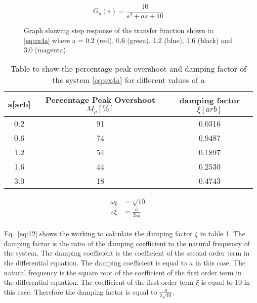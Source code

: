 \renewcommand{\ex}{ex4a}

\begin{equation}
	G_{p}\left(s\right)=\frac{10}{s^2 + as + 10}
	\label{eq:\ex}
\end{equation}


\begin{figure}[ht!]
	\centering
	
	\caption{Graph showing step response of the transfer function shown in \eqref{eq:\ex} where a = 0.2 (red), 0.6 (green), 1.2 (blue), 1.6 (black) and 3.0 (magenta). \appendixamble{\ex}}
	\label{fig:\ex}
\end{figure}\FloatBarrier


\begin{table}[ht!]
    \centering
    \begin{tabular}{|c|c|c|}
    \hline
    a{[}arb{]} & Percentage Peak Overshoot $M_p[\%]$ & damping factor $\xi[arb]$ \\ \hline
    0.2        & 91                                  & 0.0316                    \\ \hline
    0.6        & 74                                  & 0.9487                    \\ \hline
    1.2        & 54                                  & 0.1897                    \\ \hline
    1.6        & 44                                  & 0.2530                    \\ \hline
    3.0        & 18                                  & 0.4743                    \\ \hline
    \end{tabular}
    \caption{Table to show the percentage peak overshoot and damping factor of the system \eqref{eq:\ex} for different values of a}\label{table:\ex}
    \end{table}\FloatBarrier

    \begin{equation}
    \begin{split}
        \omega_0 &= \sqrt{10}\\
        \therefore \xi &= \frac{a}{2\omega_0}\\
    \end{split}\label{eq:12}
    \end{equation}

Eq.~\eqref{eq:12} shows the working to calculate the damping factor $\xi$ in table \ref{table:\ex}. The damping factor is the ratio of the damping coefficient to the natural frequency of the system. The damping coefficient is the coefficient of the second order term in the differential equation. The damping coefficient is equal to $a$ in this case. The natural frequency is the square root of the coefficient of the first order term in the differential equation. The coefficient of the first order term  $\xi$ is equal to 10 in this case. Therefore the damping factor is equal to $\frac{a}{2\sqrt{10}}$.

